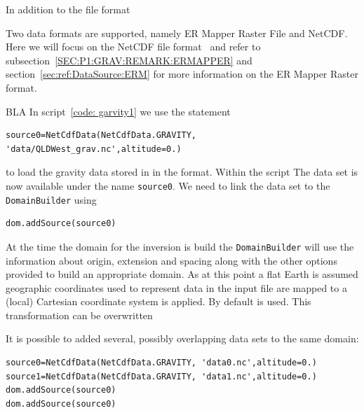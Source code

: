 
In addition to the \netcdf file format 


Two data formats are supported, namely ER Mapper Raster File and NetCDF. Here we will
focus on the NetCDF file format~\cite{NETCDF} and refer to subsection~\ref{SEC:P1:GRAV:REMARK:ERMAPPER} and
section~\ref{sec:ref:DataSource:ERM} for more information on the ER Mapper Raster format.

BLA
In script~\ref{code: garvity1} we use the statement 
\begin{verbatim}
source0=NetCdfData(NetCdfData.GRAVITY, 'data/QLDWest_grav.nc',altitude=0.)
\end{verbatim}
  
to load the gravity data stored in  in the \netcdf format. 
Within the script The data set is now available under the name \verb|source0|. We need to link
the data set to the \verb|DomainBuilder| using 
\begin{verbatim}
dom.addSource(source0)
\end{verbatim}
At the time the domain for the inversion is build the \verb|DomainBuilder| will use the information about
origin, extension and spacing along with the other options provided to build an appropriate domain. As at this point a
flat Earth is assumed geographic coordinates used to represent data in the input file 
are mapped to a (local) Cartesian coordinate system is applied. By default  is used. 
This transformation can be overwritten       
   
It is possible to added several, possibly overlapping data sets to the same domain:
\begin{verbatim}
source0=NetCdfData(NetCdfData.GRAVITY, 'data0.nc',altitude=0.)
source1=NetCdfData(NetCdfData.GRAVITY, 'data1.nc',altitude=0.)
dom.addSource(source0)
dom.addSource(source0)
\end{verbatim}

